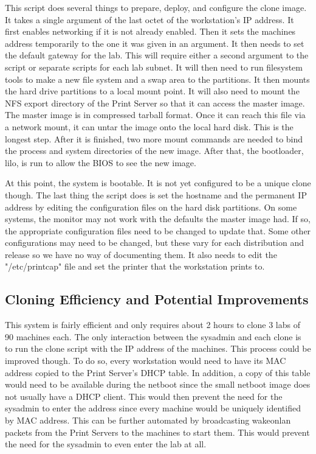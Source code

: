 This script does several things to prepare, deploy, and configure the clone image.  It takes a single argument of the last octet of the workstation's IP address.  It first enables networking if it is not already enabled.  Then it sets the machines address temporarily to the one it was given in an argument.  It then needs to set the default gateway for the lab.  This will require either a second argument to the script or separate scripts for each lab subnet.  It will then need to run filesystem tools to make a new file system and a swap area to the partitions.  It then mounts the hard drive partitions to a local mount point.  It will also need to mount the NFS export directory of the Print Server so that it can access the master image.  The master image is in compressed tarball format.  Once it can reach this file via a network mount, it can untar the image onto the local hard disk.  This is the longest step.  After it is finished, two more mount commands are needed to bind the process and system directories of the new image.  After that, the bootloader, lilo, is run to allow the BIOS to see the new image.  

At this point, the system is bootable.  It is not yet configured to be a unique clone though.  The last thing the script does is set the hostname and the permanent IP address by editing the configuration files on the hard disk partitions.  On some systems, the monitor may not work with the defaults the master image had.  If so, the appropriate configuration files need to be changed to update that.  Some other configurations may need to be changed, but these vary for each distribution and release so we have no way of documenting them.  It also needs to edit the "/etc/printcap" file and set the printer that the workstation prints to.
\subsection{Cloning Efficiency and Potential Improvements}
This system is fairly efficient and only requires about 2 hours to clone 3 labs of 90 machines each.  The only interaction between the sysadmin and each clone is to run the clone script with the IP address of the machines.  This process could be improved though.  To do so, every workstation would need to have its MAC address copied to the Print Server's DHCP table.  In addition, a copy of this table would need to be available during the netboot since the small netboot image does not usually have a DHCP client.  This would then prevent the need for the sysadmin to enter the address since every machine would be uniquely identified by MAC address.  This can be further automated by broadcasting wakeonlan packets from the Print Servers to the machines to start them.  This would prevent the need for the sysadmin to even enter the lab at all.  

